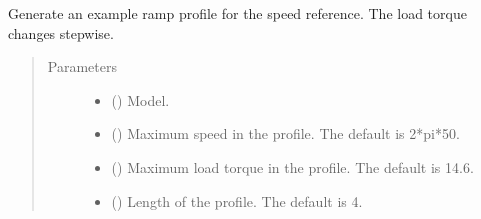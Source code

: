 \documentclass[letterpaper,10pt,english]{sphinxmanual}
\begin{document}
\begin{fulllineitems}
\label{\detokenize{helpers:helpers.ref_ramp}}
\pysigstartsignatures
{}
\pysigstopsignatures
\sphinxAtStartPar
Generate an example ramp profile for the speed reference. The load torque
changes stepwise.
\begin{quote}\begin{description}
\item[{Parameters}] \leavevmode\begin{itemize}
\item {} 
\sphinxAtStartPar
{} () \textendash{} Model.

\item {} 
\sphinxAtStartPar
{} (\sphinxstyleliteralemphasis{\sphinxupquote{, }}) \textendash{} Maximum speed in the profile. The default is 2*pi*50.

\item {} 
\sphinxAtStartPar
{} (\sphinxstyleliteralemphasis{\sphinxupquote{, }}) \textendash{} Maximum load torque in the profile. The default is 14.6.

\item {} 
\sphinxAtStartPar
{} (\sphinxstyleliteralemphasis{\sphinxupquote{, }}) \textendash{} Length of the profile. The default is 4.

\end{itemize}

\end{description}\end{quote}

\end{fulllineitems}

\end{document}
